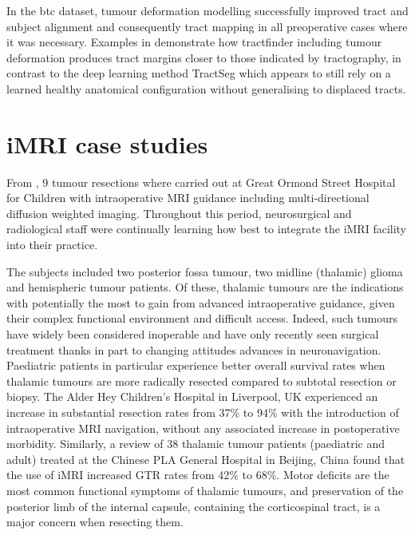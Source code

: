 In the \gls{btc} dataset, tumour deformation modelling successfully improved tract and subject alignment and consequently tract mapping in all preoperative cases where it was necessary.
Examples in  demonstrate how tractfinder including tumour deformation produces tract margins closer to those indicated by tractography, in contrast to the deep learning method TractSeg which appears to still rely on a learned healthy anatomical configuration without generalising to displaced tracts.

\clearpage
\section{iMRI case studies}

From , 9  tumour resections where carried out at Great Ormond Street Hospital for Children with intraoperative MRI guidance including multi-directional diffusion weighted imaging.
Throughout this period, neurosurgical and radiological staff were continually learning how best to integrate the iMRI facility into their practice.

The subjects included two posterior fossa tumour, two midline (thalamic) glioma and  hemispheric tumour patients.
Of these, thalamic tumours are the indications with potentially the most to gain from advanced intraoperative guidance, given their complex functional environment and difficult access.
Indeed, such tumours have widely been considered inoperable and have only recently seen surgical treatment thanks in part to changing attitudes\autocite{Souweidane1996,Puget2007} advances in neuronavigation.\autocite{Sunderland2021}
Paediatric patients in particular\autocite{Ferroli2023} experience better overall survival rates when thalamic tumours are more radically resected compared to subtotal resection or biopsy.\autocite{Cinalli2018a}
The Alder Hey Children's Hospital in Liverpool, UK experienced an increase in substantial resection  rates from 37\% to 94\% with the introduction of intraoperative MRI navigation, without any associated increase in postoperative morbidity.\autocite{Sunderland2021}
Similarly, a review of 38 thalamic tumour patients (paediatric and adult) treated at the Chinese PLA General Hospital in Beijing, China found that the use of iMRI increased GTR rates from 42\% to 68\%.\autocite{Zheng2016}
Motor deficits are the most common functional symptoms of thalamic tumours,\autocite{Puget2007, Zheng2016, Palmisciano2021} and preservation of the posterior limb of the internal capsule, containing the corticospinal tract, is a major concern when resecting them.

